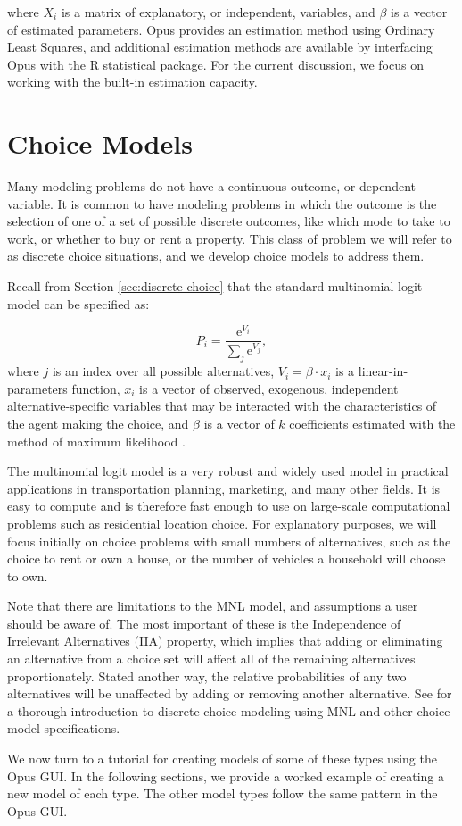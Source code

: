 where $X_i$ is a matrix of explanatory, or independent,
variables, and $\beta$ is a vector of estimated parameters.
Opus provides an estimation method using Ordinary Least
Squares, and additional estimation methods are available by
interfacing Opus with the R statistical package.  For the
current discussion, we focus on working with the built-in
estimation capacity.

\section{Choice Models}
%
\label{sec:components-choice-model}
%

Many modeling problems do not have a continuous outcome, or
dependent variable.  It is common to have modeling problems
in which the outcome is the selection of one of a set of
possible discrete outcomes, like which mode to take to work,
or whether to buy or rent a property.  This class of problem
we will refer to as discrete choice situations, and we
develop choice models to address them.

Recall from Section \ref{sec:discrete-choice} that the
standard multinomial logit model
\cite{mcfadden-1974,mcfadden-1981} can be specified as:

\begin{equation}
    P_i = \frac{\mathrm{e}^{V_i}}{\sum_j \mathrm{e}^{V_j}},
\end{equation}
where $j$ is an index over all possible alternatives,
$V_i = \beta\cdot {x}_i$ is a linear-in-parameters
function, $x_i$ is a vector of observed, exogenous, independent
alternative-specific variables that may be interacted with the
characteristics of the agent making the choice,
and $\beta$ is a vector of $k$ coefficients
estimated with the method of maximum likelihood \cite{greene-2002}.

The multinomial logit model is a very robust and widely used
model in practical applications in transportation planning,
marketing, and many other fields.  It is easy to compute and
is therefore fast enough to use on large-scale computational
problems such as residential location choice.  For
explanatory purposes, we will focus initially on choice
problems with small numbers of alternatives, such as the
choice to rent or own a house, or the number of vehicles a
household will choose to own.

Note that there are limitations to the MNL model, and
assumptions a user should be aware of.  The most important
of these is the Independence of Irrelevant Alternatives
(IIA) property, which implies that adding or eliminating an
alternative from a choice set will affect all of the
remaining alternatives proportionately.  Stated another way,
the relative probabilities of any two alternatives will be
unaffected by adding or removing another alternative.  See
\cite{train-book-2003} for a thorough introduction to
discrete choice modeling using MNL and other choice model
specifications.

We now turn to a tutorial for creating models of some of
these types using the Opus GUI.  In the following sections,
we provide a worked example of creating a new model of each
type.  The other model types follow the same pattern in the
Opus GUI.


